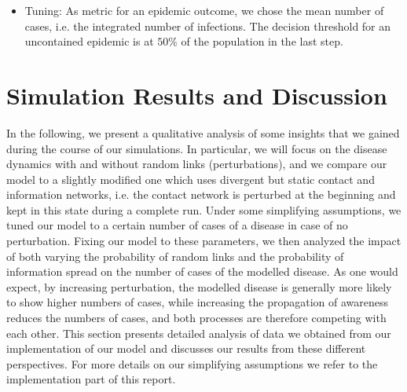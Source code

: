\documentclass[11pt]{article}
\begin{document}
\begin{itemize}
  \item Tuning: As metric for an epidemic outcome, we chose the mean number of cases, i.e. the integrated number of infections. The decision threshold for an uncontained epidemic is at $50 \%$ of the population in the last step.
\end{itemize}

\section{Simulation Results and Discussion}

In the following, we present a qualitative analysis of some insights that we gained during the course of our simulations. In particular, we will focus on the disease dynamics with and without random links (perturbations), and we compare our model to a slightly modified one which uses divergent but static contact and information networks, i.e. the contact network is perturbed at the beginning and kept in this state during a complete run. Under some simplifying assumptions, we tuned our model to a certain number of cases of a disease in case of no perturbation. Fixing our model to these parameters, we then analyzed the impact of both varying the probability of random links and the probability of information spread on the number of cases of the modelled disease. As one would expect, by increasing perturbation, the modelled disease is generally more likely to show higher numbers of cases, while increasing the propagation of awareness reduces the numbers of cases, and both processes are therefore competing with each other. This section presents detailed analysis of data we obtained from our implementation of our model and discusses our results from these different perspectives. For more details on our simplifying assumptions we refer to the implementation part of this report.
\end{document}
